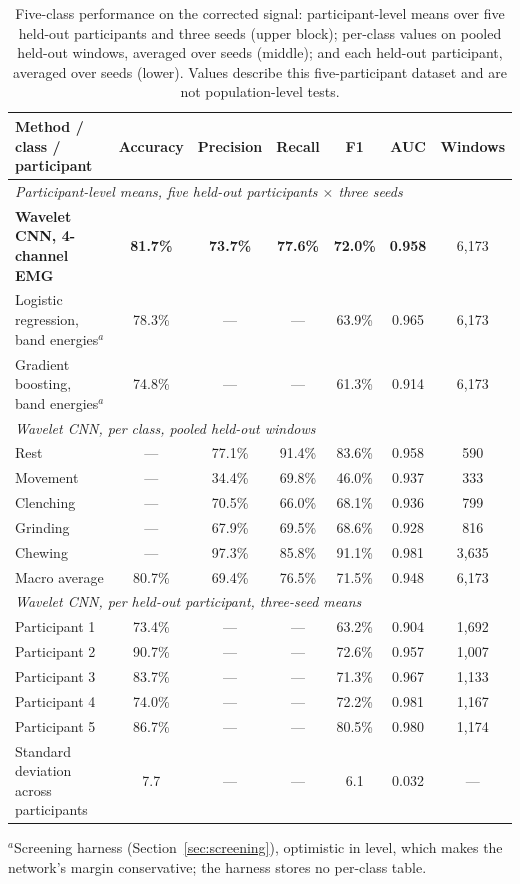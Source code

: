 \documentclass[journal]{IEEEtran}
\begin{document}
\begin{table}[!t]
  \centering
  \caption{Five-class performance on the corrected signal: participant-level means over five held-out participants and three seeds (upper block); per-class values on pooled held-out windows, averaged over seeds (middle); and each held-out participant, averaged over seeds (lower). Values describe this five-participant dataset and are not population-level tests.}
  \label{tab:results}
  \footnotesize
  \begin{tabular*}{\textwidth}{@{\extracolsep{\fill}}lcccccc@{}}
    \toprule
    Method / class / participant & Accuracy & Precision & Recall & F1 & AUC & Windows \\
    \midrule
    \multicolumn{7}{l}{\emph{Participant-level means, five held-out participants $\times$ three seeds}}\\
    \textbf{Wavelet CNN, 4-channel EMG} & \textbf{81.7\%} & \textbf{73.7\%} & \textbf{77.6\%} & \textbf{72.0\%} & \textbf{0.958} & 6,173 \\
    Logistic regression, band energies$^{a}$ & 78.3\% & --- & --- & 63.9\% & 0.965 & 6,173 \\
    Gradient boosting, band energies$^{a}$ & 74.8\% & --- & --- & 61.3\% & 0.914 & 6,173 \\
    \midrule
    \multicolumn{7}{l}{\emph{Wavelet CNN, per class, pooled held-out windows}}\\
    Rest & --- & 77.1\% & 91.4\% & 83.6\% & 0.958 & 590 \\
    Movement & --- & 34.4\% & 69.8\% & 46.0\% & 0.937 & 333 \\
    Clenching & --- & 70.5\% & 66.0\% & 68.1\% & 0.936 & 799 \\
    Grinding & --- & 67.9\% & 69.5\% & 68.6\% & 0.928 & 816 \\
    Chewing & --- & 97.3\% & 85.8\% & 91.1\% & 0.981 & 3,635 \\
    Macro average & 80.7\% & 69.4\% & 76.5\% & 71.5\% & 0.948 & 6,173 \\
    \midrule
    \multicolumn{7}{l}{\emph{Wavelet CNN, per held-out participant, three-seed means}}\\
    Participant 1 & 73.4\% & --- & --- & 63.2\% & 0.904 & 1,692 \\
    Participant 2 & 90.7\% & --- & --- & 72.6\% & 0.957 & 1,007 \\
    Participant 3 & 83.7\% & --- & --- & 71.3\% & 0.967 & 1,133 \\
    Participant 4 & 74.0\% & --- & --- & 72.2\% & 0.981 & 1,167 \\
    Participant 5 & 86.7\% & --- & --- & 80.5\% & 0.980 & 1,174 \\
    Standard deviation across participants & 7.7 & --- & --- & 6.1 & 0.032 & --- \\
    \bottomrule
  \end{tabular*}
  \begin{flushleft}\footnotesize
  $^{a}$Screening harness (Section~\ref{sec:screening}), optimistic in level, which makes the network's margin conservative; the harness stores no per-class table.
  \end{flushleft}
\end{table}
\end{document}
